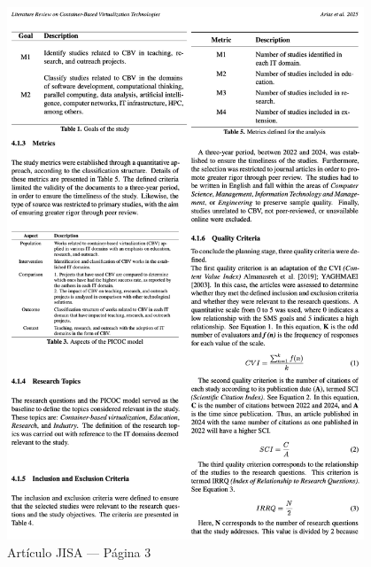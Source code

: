 \begin{figure}[H]
	\centering
	\begin{tcolorbox}[
			colback=white,
			colframe=gray!50,
			boxrule=1pt,
			arc=2pt,
			boxsep=5pt,
			left=3pt,
			right=3pt,
			top=3pt,
			bottom=3pt,
			drop shadow
		]
		\includegraphics[width=0.95\textwidth,keepaspectratio]{apendices/JISA/pagina_3.png}
	\end{tcolorbox}
	\caption{Artículo JISA --- Página 3}\label{fig:jisa-pagina-3}
\end{figure}
\FloatBarrier%
